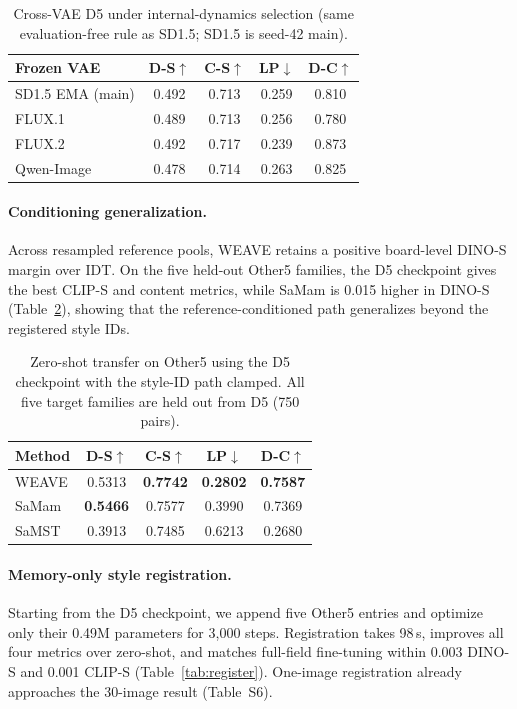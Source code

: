 \documentclass[letterpaper]{article} %
\begin{document}
\begin{table}[ht]
\centering
{\small
\setlength{\tabcolsep}{3.5pt}
\begin{tabular}{@{}lcccc@{}}
\toprule
Frozen VAE & D-S$\uparrow$ & C-S$\uparrow$ & LP$\downarrow$ & D-C$\uparrow$ \\
\midrule
SD1.5 EMA (main) & 0.492 & 0.713 & 0.259 & 0.810 \\
FLUX.1 & 0.489 & 0.713 & 0.256 & 0.780 \\
FLUX.2 & 0.492 & 0.717 & 0.239 & 0.873 \\
Qwen-Image & 0.478 & 0.714 & 0.263 & 0.825 \\
\bottomrule
\end{tabular}
}
\caption{Cross-VAE D5 under internal-dynamics selection (same evaluation-free rule as
SD1.5; SD1.5 is seed-42 main).}
\label{tab:vae-port}
\end{table}

\paragraph{Conditioning generalization.}
Across resampled reference pools, WEAVE retains a positive board-level
DINO-S margin over IDT. On the five held-out Other5 families, the D5
checkpoint gives the best CLIP-S and content metrics, while SaMam is
0.015 higher in DINO-S (Table~\ref{tab:ooze}), showing that the
reference-conditioned path generalizes beyond the registered style IDs.

\begin{table}[ht]
\centering
{\small
\begin{tabular}{@{}lcccc@{}}
\toprule
Method & D-S$\uparrow$ & C-S$\uparrow$ & LP$\downarrow$ & D-C$\uparrow$ \\
\midrule
WEAVE & 0.5313 & \textbf{0.7742} & \textbf{0.2802} & \textbf{0.7587} \\
SaMam & \textbf{0.5466} & 0.7577 & 0.3990 & 0.7369 \\
SaMST & 0.3913 & 0.7485 & 0.6213 & 0.2680 \\
\bottomrule
\end{tabular}
}
\caption{Zero-shot transfer on Other5 using the D5 checkpoint with the style-ID path
clamped. All five target families are held out from D5 (750 pairs).}
\label{tab:ooze}
\end{table}

\paragraph{Memory-only style registration.}
Starting from the D5 checkpoint, we append five Other5 entries and
optimize only their 0.49M parameters for 3{,}000 steps. Registration
takes 98\,s, improves all four metrics over zero-shot, and matches
full-field fine-tuning within 0.003 DINO-S and 0.001 CLIP-S
(Table~\ref{tab:register}). One-image registration already approaches
the 30-image result (Table~S6).
\end{document}
